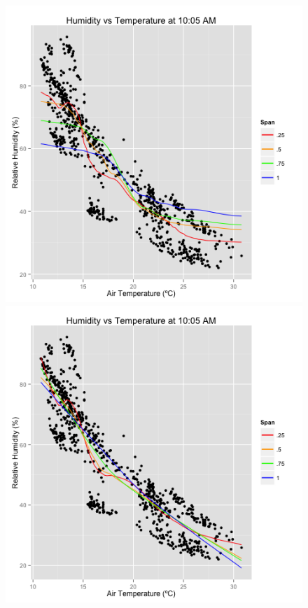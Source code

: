 \documentclass[english]{article}\usepackage{graphicx, color}
\numberwithin{equation}{section}
\numberwithin{figure}{section}
\begin{document}
\begin{figure}
\begin{center}
\includegraphics[scale = .4]{Humidity_Temperature_Loess_0.png}
\includegraphics[scale = .4]{Humidity_Temperature_Loess_1.png}
\end{center}


\end{figure}
\end{document}
